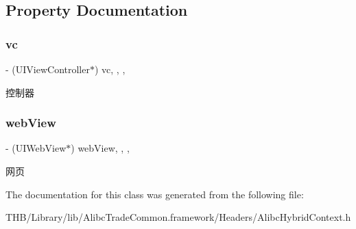 \subsection{Property Documentation}
\mbox{\label{interface_alibc_hybrid_context_ab7a51d597078510fff06b75aebca3ae2}} 
\subsubsection{\texorpdfstring{vc}{vc}}
{\footnotesize\ttfamily -\/ (U\+I\+View\+Controller$\ast$) vc\hspace{0.3cm}{\ttfamily [read]}, {\ttfamily [write]}, {\ttfamily [nonatomic]}, {\ttfamily [weak]}}

控制器 \mbox{\label{interface_alibc_hybrid_context_a0191a70e1496fafd8f6700e3c68f28b8}} 
\subsubsection{\texorpdfstring{web\+View}{webView}}
{\footnotesize\ttfamily -\/ (U\+I\+Web\+View$\ast$) web\+View\hspace{0.3cm}{\ttfamily [read]}, {\ttfamily [write]}, {\ttfamily [nonatomic]}, {\ttfamily [weak]}}

网页 

The documentation for this class was generated from the following file\+:\begin{DoxyCompactItemize}
\item 
T\+H\+B/\+Library/lib/\+Alibc\+Trade\+Common.\+framework/\+Headers/Alibc\+Hybrid\+Context.\+h\end{DoxyCompactItemize}
